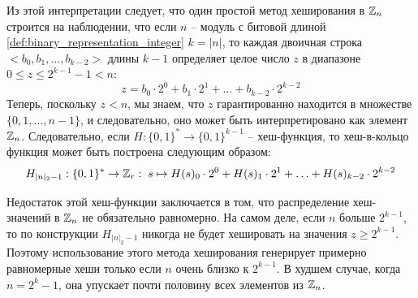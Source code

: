 Из этой интерпретации следует, что один простой метод хеширования в $\mathbb{Z}_n$ строится на наблюдении, что если $n$ -- модуль с битовой длиной \eqref{def:binary_representation_integer} $k=|n|$, то каждая двоичная строка $<b_0,b_1,\ldots,b_{k-2}>$ длины $k-1$ определяет целое число $z$ в диапазоне $0\leq z \leq 2^{k-1}-1< n $:
\begin{equation}
z = b_0\cdot 2^0 + b_1\cdot 2^1 + \ldots + b_{k-2}\cdot 2^{k-2}
\end{equation}
Теперь, поскольку $z<n$, мы знаем, что $z$ гарантированно находится в множестве $\{0,1,\ldots,n-1\}$, и следовательно, оно может быть интерпретировано как элемент $\mathbb{Z}_n$. Следовательно, если $H:\{0,1\}^*\to\{0,1\}^{k-1}$ -- хеш-функция, то хеш-в-кольцо функция может быть построена следующим образом:
\begin{equation}\label{eq:hash-Zr}
H_{|n|_2-1}: \{0,1\}^* \to \mathbb{Z}_r: \; s \mapsto
H(s)_0\cdot 2^0 + H(s)_1\cdot 2^1 + \ldots + H(s)_{k-2}\cdot 2^{k-2}
\end{equation}

Недостаток этой хеш-функции заключается в том, что распределение хеш-значений в $\mathbb{Z}_n$ не обязательно равномерно. На самом деле, если $n$ больше $2^{k-1}$, то по конструкции $H_{|n|_2-1}$ никогда не будет хешировать на значения $z\geq 2^{k-1}$. Поэтому использование этого метода хеширования генерирует примерно равномерные хеши только если $n$ очень близко к $2^{k-1}$. В худшем случае, когда $n=2^k-1$, она упускает почти половину всех элементов из $\mathbb{Z}_n$.

